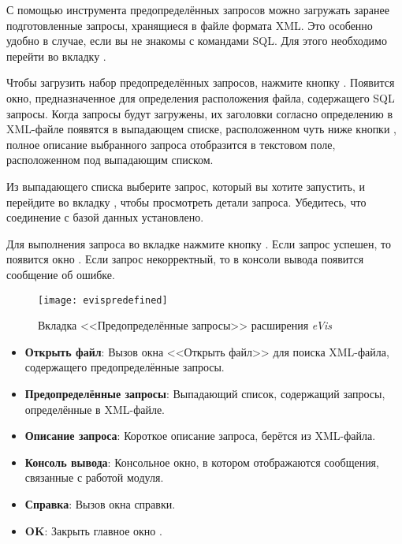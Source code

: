 С помощью инструмента предопределённых запросов можно загружать заранее
подготовленные запросы, хранящиеся в файле формата XML. Это особенно удобно
в случае, если вы не знакомы с командами SQL. Для этого необходимо перейти
во вкладку .

Чтобы загрузить набор предопределённых запросов, нажмите кнопку
. Появится окно, предназначенное для
определения расположения файла, содержащего SQL запросы. Когда запросы будут
загружены, их заголовки согласно определению в XML-файле появятся в выпадающем
списке, расположенном чуть ниже кнопки ,
полное описание выбранного запроса отобразится в текстовом поле, расположенном
под выпадающим списком.

Из выпадающего списка выберите запрос, который вы хотите запустить, и перейдите
во вкладку , чтобы просмотреть детали запроса. Убедитесь, что
соединение с базой данных установлено.

Для выполнения запроса во вкладке  нажмите кнопку
. Если запрос успешен, то появится окно .
Если запрос некорректный, то в консоли вывода появится сообщение об ошибке.

\begin{figure}[htp]
   \centering
   \texttt{[image: evispredefined]}
   \caption{Вкладка <<Предопределённые запросы>> расширения \emph{eVis} \wincaption}\label{evispredefined}
\end{figure}

\begin{itemize}[label=--]
\item \textbf{Открыть файл}: Вызов окна <<Открыть файл>> для поиска
XML-файла, содержащего предопределённые запросы.
\item \textbf{Предопределённые запросы}: Выпадающий список, содержащий запросы,
определённые в XML-файле.
\item \textbf{Описание запроса}: Короткое описание запроса, берётся из
XML-файла.
\item \textbf{Консоль вывода}: Консольное окно, в котором отображаются
сообщения, связанные с работой модуля.
\item \textbf{Справка}: Вызов окна справки.
\item \textbf{OK}: Закрыть главное окно .
\end{itemize}

\label{evis_xml_format}


